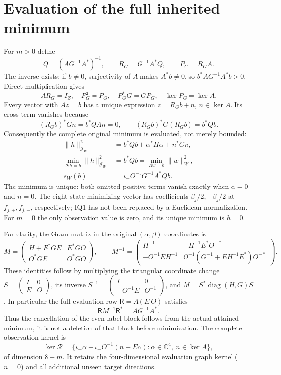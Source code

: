 \documentclass[11pt]{article}
\newcommand{\C}{\mathbb C}
\newcommand{\diag}{\operatorname{diag}}
\begin{document}
\section{Evaluation of the full inherited minimum}
For $m>0$ define
\[
 Q=(AG^{-1}A^*)^{-1},\qquad R_G=G^{-1}A^*Q,\qquad
 P_G=R_GA.                                          \tag{IQ6}
\]
The inverse exists: if $b\ne0$, surjectivity of $A$ makes $A^*b\ne0$,
so $b^*AG^{-1}A^*b>0$.  Direct multiplication gives
\[
 AR_G=I_Z,\quad P_G^2=P_G,\quad P_G^*G=GP_G,
 \quad\ker P_G=\ker A.                              \tag{IQ7}
\]
Every vector with $Az=b$ has a unique expression $z=R_Gb+n$, $n\in\ker A$.
Its cross term vanishes because
\[
 (R_Gb)^*Gn=b^*QA n=0,\qquad
 (R_Gb)^*G(R_Gb)=b^*Qb.
\]
Consequently the complete original minimum is evaluated, not merely bounded:
\[
 \begin{split}
 \|h\|_{\mathcal J_W}^2
   &=b^*Qb+\alpha^*H\alpha+n^*Gn,\\
 \min_{\mathcal Rh=b}\|h\|_{\mathcal J_W}^2
   &=b^*Qb
    =\min_{\Lambda w=b}\|w\|_W^2,\\
 s_W(b)&=\iota_-O^{-1}G^{-1}A^*Qb.
 \end{split}                                       \tag{IQ8}
\]
The minimum is unique: both omitted positive terms vanish exactly when
$\alpha=0$ and $n=0$.  The eight-state minimizing vector has coefficients
$\beta_j/2,-\beta_j/2$ at $f_{j,+},f_{j,-}$, respectively; IQ1 has not been
replaced by a Euclidean normalization.  For $m=0$ the only observation value
is zero, and its unique minimum is $h=0$.

For clarity, the Gram matrix in the original $(\alpha,\beta)$ coordinates is
\[
 M=\begin{pmatrix}
 H+E^*GE&E^*GO\\ O^*GE&O^*GO
 \end{pmatrix},\qquad
 M^{-1}=\begin{pmatrix}
 H^{-1}&-H^{-1}E^*O^{-*}\\
 -O^{-1}EH^{-1}&O^{-1}(G^{-1}+EH^{-1}E^*)O^{-*}
 \end{pmatrix}.                                    \tag{IQ9}
\]
These identities follow by multiplying the triangular coordinate change
$S=\left(\begin{smallmatrix}I&0\\E&O\end{smallmatrix}\right)$, its inverse
$S^{-1}=\left(\begin{smallmatrix}I&0\\-O^{-1}E&O^{-1}\end{smallmatrix}\right)$,
and $M=S^*\diag(H,G)S$.  In particular the full evaluation row
$\mathsf R=A(E\ O)$ satisfies
\[
 \mathsf R M^{-1}\mathsf R^*=AG^{-1}A^*.              \tag{IQ10}
\]
Thus the cancellation of the even-label block follows from the actual
attained minimum; it is not a deletion of that block before minimization.
The complete observation kernel is
\[
 \ker\mathcal R=
 \{\iota_+\alpha+\iota_-O^{-1}(n-E\alpha):
             \alpha\in\C^4,\ n\in\ker A\},          \tag{IQ11}
\]
of dimension $8-m$.  It retains the four-dimensional evaluation graph
kernel ($n=0$) and all additional unseen target directions.
\end{document}
